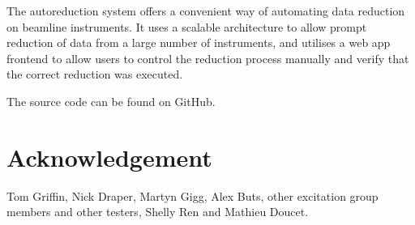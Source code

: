 \documentclass[twocolumn]{article}
\begin{document}
The autoreduction system offers a convenient way of automating data reduction
on beamline instruments. It uses a scalable architecture to allow prompt
reduction of data from a large number of instruments, and utilises a web app
frontend to allow users to control the reduction process manually and verify
that the correct reduction was executed.

The source code can be found on GitHub\cite{source}.

\section{Acknowledgement}\label{Acknowledgement}

Tom Griffin, Nick Draper, Martyn Gigg, Alex Buts, other excitation group members and other testers, Shelly Ren and Mathieu Doucet.
\end{document}
